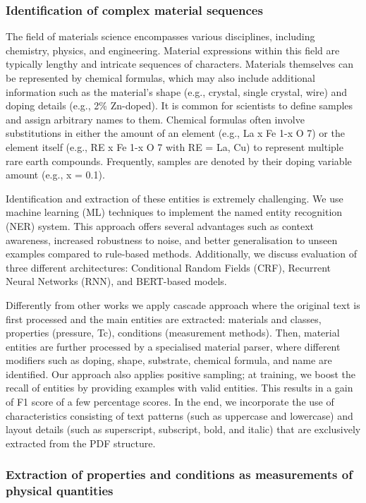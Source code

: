 \subsubsection{Identification of complex material sequences}
The field of materials science encompasses various disciplines, including chemistry, physics, and engineering. 
Material expressions within this field are typically lengthy and intricate sequences of characters. Materials themselves can be represented by chemical formulas, which may also include additional information such as the material's shape (e.g., crystal, single crystal, wire) and doping details (e.g., 2\% Zn-doped). It is common for scientists to define samples and assign arbitrary names to them. Chemical formulas often involve substitutions in either the amount of an element (e.g., La x Fe 1-x O 7) or the element itself (e.g., RE x Fe 1-x O 7 with RE = La, Cu) to represent multiple rare earth compounds. Frequently, samples are denoted by their doping variable amount (e.g., x = 0.1).

Identification and extraction of these entities is extremely challenging. 
We use machine learning (ML) techniques to implement the named entity recognition (NER) system. This approach offers several advantages such as context awareness, increased robustness to noise, and better generalisation to unseen examples compared to rule-based methods. Additionally, we discuss evaluation of three different architectures: Conditional Random Fields (CRF), Recurrent Neural Networks (RNN), and BERT-based models.

Differently from other works we apply cascade approach where the original text is first processed and the main entities are extracted: materials and classes, properties (pressure, Tc), conditions (measurement methods). 
Then, material entities are further processed by a specialised material parser, where different modifiers such as doping, shape, substrate, chemical formula, and name are identified. 
Our approach also applies positive sampling; at training, we boost the recall of entities by providing examples with valid entities. This results in a gain of F1 score of a few percentage scores. 
In the end, we incorporate the use of characteristics consisting of text patterns (such as uppercase and lowercase) and layout details (such as superscript, subscript, bold, and italic) that are exclusively extracted from the PDF structure.

\subsubsection{Extraction of properties and conditions as measurements of physical quantities}

